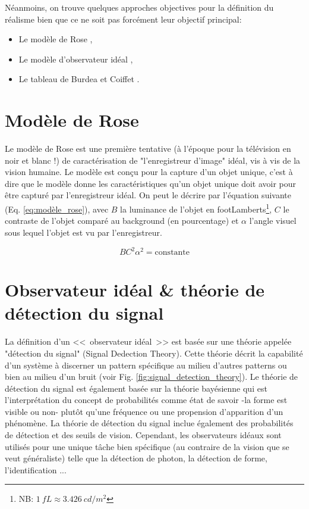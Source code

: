 	\par Néanmoins, on trouve quelques approches objectives pour la définition du réalisme bien que ce ne soit pas forcément leur objectif principal:	
		\begin{itemize}
			\item Le modèle de Rose \citep{rose_sensitivity_1948,burgess_rose_1999},
			\item Le modèle d'observateur idéal \citep{geisler_ideal_2003},
			\item Le tableau de Burdea et Coiffet \citep{burdea_realite_1993}.
		\end{itemize}
		
		\section{Modèle de Rose}		
		\par Le modèle de Rose est une première tentative (à l'époque pour la télévision en noir et blanc !) de caractérisation de "l'enregistreur d'image" idéal, vis à vis de la vision humaine. Le modèle est conçu pour la capture d'un objet unique, c'est à dire que le modèle donne les caractéristiques qu'un objet unique doit avoir pour être capturé par l'enregistreur idéal. On peut le décrire par l'équation  suivante (Eq. \ref{eq:modèle_rose}), avec $B$ la luminance de l'objet en footLamberts\footnote{NB: $1~fL \approx 3.426~cd/m^2$}, $C$ le contraste de l'objet comparé au background (en pourcentage) et $\alpha$ l'angle visuel sous lequel l'objet est vu par l'enregistreur.
		
		\begin{equation}
			BC^2\alpha^2 = \text{constante}
			\label{eq:modèle_rose} 
		\end{equation}
		
		\section{Observateur idéal \& théorie de détection du signal}		
		\par La définition d'un <<~observateur idéal~>> est basée sur une théorie appelée "détection du signal" (Signal Dedection Theory). Cette théorie décrit la capabilité d'un système à discerner un pattern spécifique au milieu d'autres patterns ou bien au milieu d'un bruit (voir Fig. \ref{fig:signal_detection_theory}). Le théorie de détection du signal est également basée sur la théorie bayésienne qui est l'interprétation du concept de probabilités comme état de savoir -la forme est visible ou non- plutôt qu'une fréquence ou une propension d'apparition d'un phénomène. La théorie de détection du signal inclue également des probabilités de détection et des seuils de vision. Cependant, les observateurs idéaux sont utilisés pour une unique tâche bien spécifique (au contraire de la vision que se veut généraliste) telle que la détection de photon, la détection de forme, l'identification ...
		
